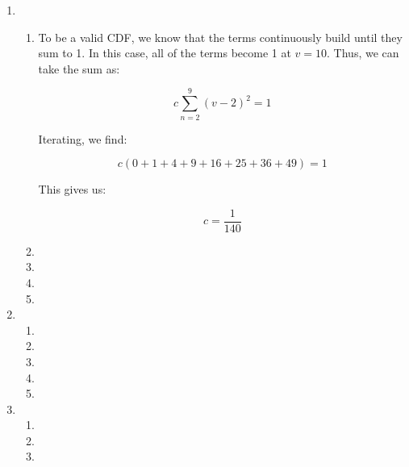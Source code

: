 \begin{enumerate}

  \item

    \begin{enumerate}

      \item To be a valid CDF, we know that the terms continuously build until they sum to 1. In this case, all of the terms become 1 at $v=10$. Thus, we can take the sum as:

        $$c\sum_{n=2}^{9} (v-2)^2=1$$

        Iterating, we find:

        $$c(0 + 1 + 4 + 9 + 16 + 25 + 36 + 49)=1$$

        This gives us:

        $$\boxed{c=\frac{1}{140}}$$

      \item 

      \item 

      \item 

      \item 

    \end{enumerate}

  \item

    \begin{enumerate}

      \item 

      \item 

      \item 

      \item 

      \item 

    \end{enumerate}

  \item

    \begin{enumerate}

      \item 

      \item 

      \item 


\end{enumerate}
\end{enumerate}
